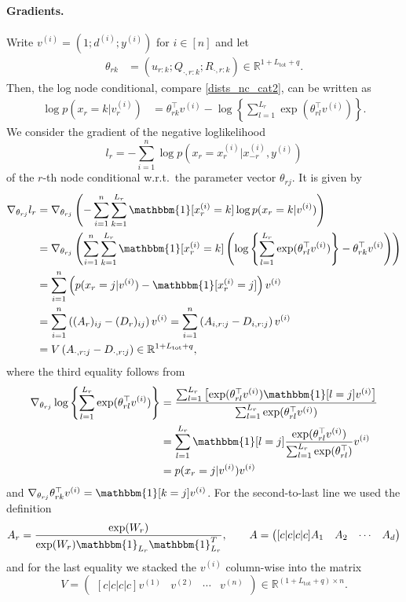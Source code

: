 \documentclass{article}
\def\tot{\text{tot}}
\newcommand{\indFunc}[1]{\mathbbm{1}[ #1 ]}
\newcommand{\oneVec}{\mathbbm{1}}
\newcommand{\IR}{{\mathbb{R}}}\newcommand{\IN}{{\mathbb{N}}}
\newcommand{\bPc}[1]{\ensuremath{\left\{#1 \right\}}} %
\newcommand{\bPe}[1]{\ensuremath{\left[#1 \right]}} %
\newcommand{\bPr}[1]{\ensuremath{\left(#1 \right)}} %
\begin{document}
\paragraph{Gradients.}
Write $v^{(i)}=(1; d^{(i)}; y^{(i)})$ for $i\in[n]$ and let
\begin{align*}
\theta_{rk} &= \bPr{ u_{r:k}; Q_{\cdot, r:k};  R_{\cdot, r:k} } \in \IR^{1+L_{\tot}+q}.
\end{align*}
Then, the log node conditional, compare \eqref{dists_nc_cat2}, can be written as
\begin{align*}
\log p(x_r = k| v_r^{(i)}) &= \theta_{rk}^\top v^{(i)} - \log\bPc{\sum_{l=1}^{L_r} \exp(\theta_{rl}^\top v^{(i)})}.
\end{align*}
We consider the gradient of the negative loglikelihood 
\[l_r= -\sum_{i=1}^n \log  p(x_r=x_r^{(i)}| x_{-r}^{(i)}, y^{(i)})\] of the $r$-th node conditional w.r.t.~the parameter vector $\theta_{rj}$.
It is given by
\begin{align*}
\nabla_{\theta_{rj}} l_r &=  \nabla_{\theta_{rj}}\bPr{-\sum_{i=1}^n \sum_{k=1}^{L_r}\indFunc{x_r^{(i)}=k} \log p(x_r = k| v^{(i)})}\\
&=\nabla_{\theta_{rj}} \bPr{ \sum_{i=1}^n \sum_{k=1}^{L_r}\indFunc{x_r^{(i)}=k} \bPr{ \log\bPc{\sum_{l=1}^{L_r} \exp(\theta_{rl}^\top v^{(i)})} - \theta_{rk}^\top v^{(i)}}}\\
&=\sum_{i=1}^n \bPr{p(x_r = j| v^{(i)})- \indFunc{x_r^{(i)}=j} } v^{(i)} \\ %
&= \sum_{i=1}^n\bPr{(A_r)_{ij} - (D_r)_{ij}} v^{(i)} = \sum_{i=1}^n\bPr{A_{i, r:j} - D_{i,r:j}} v^{(i)} \\
&= V \bPr{A_{\cdot, r:j} - D_{\cdot, r:j}} \in\IR^{1+L_{\tot}+q},
\end{align*}
where the third equality follows from
\begin{align*}
\nabla_{\theta_{rj}} \log\bPc{\sum_{l=1}^{L_r} \exp(\theta_{rl}^\top v^{(i)})}  &= \frac{\sum_{l=1}^{L_r} \bPe{ \exp(\theta_{rl}^\top v^{(i)})\indFunc{l=j} v^{(i)}}}{\sum_{l=1}^{L_r} \exp(\theta_{rl}^\top v^{(i)})}\\
&=\sum_{l=1}^{L_r} \indFunc{l=j}\frac{\exp(\theta_{rl}^\top v^{(i)}) }{\sum_{l=1}^{L_r} \exp(\theta_{rl}^\top )}v^{(i)}\\
&=p(x_r = j| v^{(i)}) v^{(i)}
\end{align*}
and $\nabla_{\theta_{rj}}  \theta_{rk}^\top v^{(i)} = \indFunc{k=j} v^{(i)}$.
For the second-to-last line we used the definition
\[A_r = \frac{\exp(W_r)}{\exp(W_r)\oneVec_{L_r}\oneVec_{L_r}^T},\qquad  A=\begin{pmatrix}[c|c|c|c]
A_1 & A_2 & \cdots & A_{d} 
\end{pmatrix}\]
and for the last equality we stacked the $v^{(i)}$ column-wise into the matrix
\[ V = \begin{pmatrix}[c|c|c|c]v^{(1)} & v^{(2)} & \cdots & v^{(n)}\end{pmatrix}\in\IR^{(1+L_{\tot}+q) \times n}.\]
\end{document}
